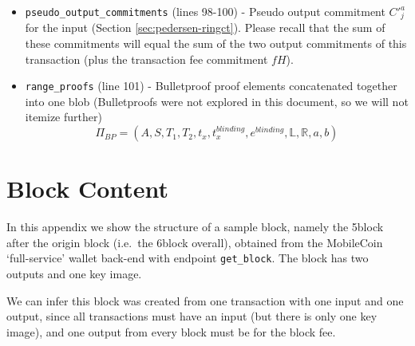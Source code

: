 \begin{appendices}
\begin{itemize}
    \item {\tt pseudo\_output\_commitments} (lines 98-100) - Pseudo output commitment $C'^a_j$ for the input (Section \ref{sec:pedersen-ringct}). Please recall that the sum of these commitments will equal the sum of the two output commitments of this transaction (plus the transaction fee commitment $f H$).
    \item {\tt range\_proofs} (line 101) - Bulletproof proof elements concatenated together into one blob (Bulletproofs were not explored in this document, so we will not itemize further)\vspace{.175cm}
    \[\Pi_{BP} = (A, S, T_1, T_2, t_x, t^{blinding}_x, e^{blinding}, \mathbb{L}, \mathbb{R}, a, b)\]
\end{itemize}




\chapter{Block Content}
\label{appendix:block-content}

In this appendix we show the structure of a sample block, namely the 5\nth block after the origin block (i.e.\ the 6\nth block overall), obtained from the MobileCoin `full-service' wallet back-end \cite{mobilecoin-full-service-source-code} with endpoint {\tt get\_block}. The block has two outputs and one key image.

We can infer this block was created from one transaction with one input and one output, since all transactions must have an input (but there is only one key image), and one output from every block must be for the block fee.


\end{appendices}
